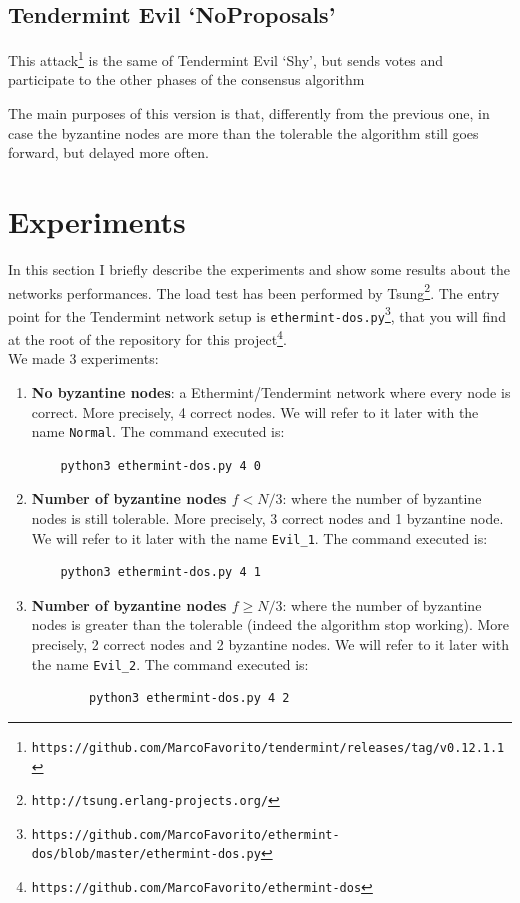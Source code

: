 \documentclass[]{article}
\begin{document}
\subsection{Tendermint Evil `NoProposals'}
This attack\footnote{\texttt{https://github.com/MarcoFavorito/tendermint/releases/tag/v0.12.1.1}} is the same of Tendermint Evil `Shy', but sends votes and participate to the other phases of the consensus algorithm

The main purposes of this version is that, differently from the previous one, in case the byzantine nodes are more than the tolerable the algorithm still goes forward, but delayed more often.

\section{Experiments}
\label{bench}
In this section I briefly describe the experiments and show some results about the networks performances. The load test has been performed by Tsung\footnote{\texttt{http://tsung.erlang-projects.org/}}. The entry point for the Tendermint network setup is \texttt{ethermint-dos.py}\footnote{\texttt{https://github.com/MarcoFavorito/ethermint-dos/blob/master/ethermint-dos.py}}, that you will find at the root of the repository for this project\footnote{\texttt{https://github.com/MarcoFavorito/ethermint-dos}}. \\

We made 3 experiments:
\begin{enumerate}
	\item \textbf{No byzantine nodes}: a Ethermint/Tendermint network where every node is correct. More precisely, 4 correct nodes. We will refer to it later with the name \texttt{Normal}. The command executed is:
	\begin{verbatim}
	python3 ethermint-dos.py 4 0
	\end{verbatim}
	\item \textbf{Number of byzantine nodes $f < N/3$}: where the number of byzantine nodes is still tolerable. More precisely, 3 correct nodes and 1 byzantine node. We will refer to it later with the name \texttt{Evil\_1}. The command executed is:
	\begin{verbatim}
	python3 ethermint-dos.py 4 1
	\end{verbatim}
	\item \textbf{Number of byzantine nodes $f \ge N/3$}: where the number of byzantine nodes is greater than the tolerable (indeed the algorithm stop working). More precisely, 2 correct nodes and 2 byzantine nodes. We will refer to it later with the name \texttt{Evil\_2}. The command executed is:
		\begin{verbatim}
		python3 ethermint-dos.py 4 2
		\end{verbatim}
\end{enumerate}
\end{document}
